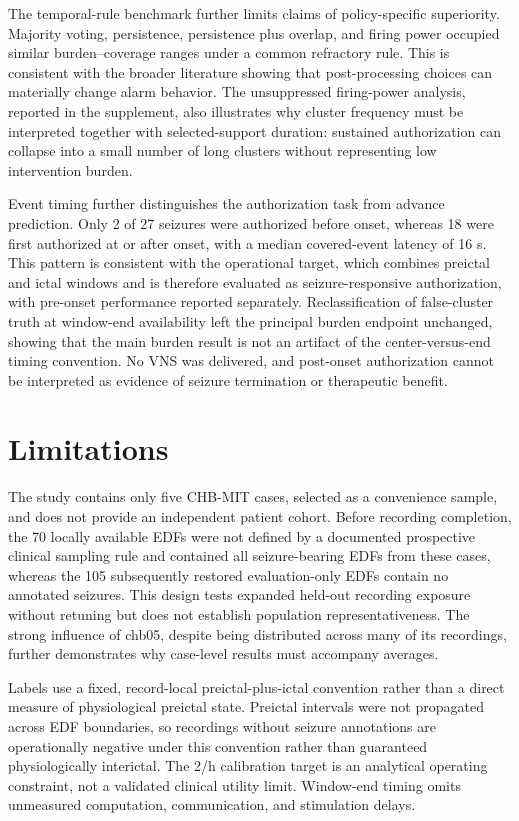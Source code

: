\documentclass[11pt,a4paper]{article}
\begin{document}
The temporal-rule benchmark further limits claims of policy-specific superiority. Majority voting, persistence, persistence plus overlap, and firing power occupied similar burden--coverage ranges under a common refractory rule. This is consistent with the broader literature showing that post-processing choices can materially change alarm behavior\citep{andrade2024samplealarm,batista2024postprocessing}. The unsuppressed firing-power analysis, reported in the supplement, also illustrates why cluster frequency must be interpreted together with selected-support duration: sustained authorization can collapse into a small number of long clusters without representing low intervention burden.

Event timing further distinguishes the authorization task from advance prediction. Only 2 of 27 seizures were authorized before onset, whereas 18 were first authorized at or after onset, with a median covered-event latency of 16 s. This pattern is consistent with the operational target, which combines preictal and ictal windows and is therefore evaluated as seizure-responsive authorization, with pre-onset performance reported separately. Reclassification of false-cluster truth at window-end availability left the principal burden endpoint unchanged, showing that the main burden result is not an artifact of the center-versus-end timing convention. No VNS was delivered, and post-onset authorization cannot be interpreted as evidence of seizure termination or therapeutic benefit.

\section{Limitations}
The study contains only five CHB-MIT cases, selected as a convenience sample, and does not provide an independent patient cohort. Before recording completion, the 70 locally available EDFs were not defined by a documented prospective clinical sampling rule and contained all seizure-bearing EDFs from these cases, whereas the 105 subsequently restored evaluation-only EDFs contain no annotated seizures. This design tests expanded held-out recording exposure without retuning but does not establish population representativeness. The strong influence of chb05, despite being distributed across many of its recordings, further demonstrates why case-level results must accompany averages.

Labels use a fixed, record-local preictal-plus-ictal convention rather than a direct measure of physiological preictal state. Preictal intervals were not propagated across EDF boundaries, so recordings without seizure annotations are operationally negative under this convention rather than guaranteed physiologically interictal. The 2/h calibration target is an analytical operating constraint, not a validated clinical utility limit. Window-end timing omits unmeasured computation, communication, and stimulation delays.
\end{document}
